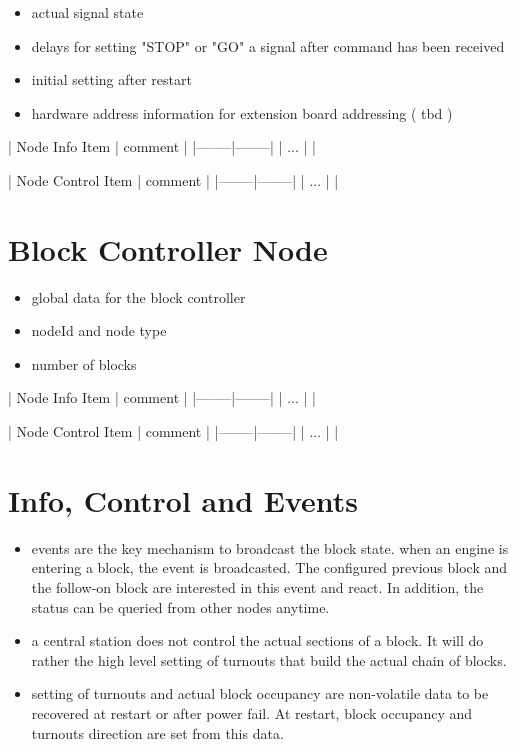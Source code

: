 \begin{itemize}
\item actual signal state
\item delays for setting "STOP" or "GO" a signal after command has been received
\item initial setting after restart
\item hardware address information for extension board addressing ( tbd )
\end{itemize}

| Node Info Item | comment |
|--------|--------|
| ... | |

| Node Control Item | comment |
|--------|--------|
| ... | |


\section{Block Controller Node}

\begin{itemize}
\item global data for the block controller
\item nodeId and node type
\item number of blocks
\end{itemize}

| Node Info Item | comment |
|--------|--------|
| ... | |

| Node Control Item | comment |
|--------|--------|
| ... | |


\section{Info, Control and Events}

\begin{itemize}
\item events are the key mechanism to broadcast the block state. when an engine is entering a block, the event is broadcasted. The configured previous block and the follow-on block are interested in this event and react. In addition, the status can be queried from other nodes anytime.
\item a central station does not control the actual sections of a block. It will do rather the high level setting of turnouts that build the actual chain of blocks.
\item setting of turnouts and actual block occupancy are non-volatile data to be recovered at restart or after power fail. At restart, block occupancy and turnouts direction are set from this data.
\end{itemize}

